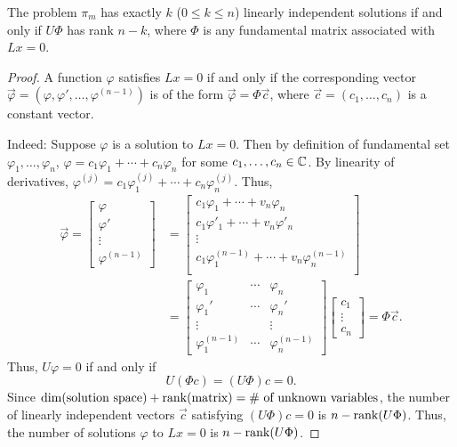 \documentclass[10.5pt, oneside, a4paper]{article}
\begin{document}
\begin{thm}\label{thm:exactly k l.i.d solutions iff rank n-k}
    The problem $\pi_m$ has exactly $k$ ($0\leq k\leq n$) linearly independent solutions if and only if $U\Phi$ has rank $n-k$, where $\Phi$ is any fundamental matrix associated with $Lx=0$.
\end{thm}
\begin{proof}
    A function $\varphi$ satisfies $Lx=0$ if and only if the corresponding vector $\vec{\varphi}=(\varphi, \varphi', \ldots, \varphi^{(n-1)})$ is of the form $\vec{\varphi}=\Phi \vec{c}$, where $\vec{c}=(c_1,\ldots, c_n)$ is a constant vector.

    {\color{blue}
    Indeed: Suppose $\varphi$ is a solution to $Lx=0$. Then by definition of fundamental set $\varphi_1,\ldots,\varphi_n$, $\varphi = c_1\varphi_1+\cdots+c_n\varphi_n$ for some $c_1,\ldots,c_n\in\mathbb C$. By linearity of derivatives, $\varphi^{(j)} = c_1\varphi_1^{(j)} + \cdots + c_n\varphi_n^{(j)}$. Thus,
    \begin{align*}
        \vec{\varphi} =
        \begin{bmatrix}
            \varphi\\
            \varphi'\\
            \vdots\\
            \varphi^{(n-1)}
        \end{bmatrix} &= 
        \begin{bmatrix}
            c_1\varphi_1 + \cdots + v_n\varphi_n\\
            c_1\varphi'_1 + \cdots + v_n\varphi'_n\\
            \vdots\\
            c_1\varphi^{(n-1)}_1 + \cdots + v_n\varphi^{(n-1)}_n\\
        \end{bmatrix}\\
        &= \begin{bmatrix}
            \varphi_1 & \cdots & \varphi_n\\
            \varphi_1' & \cdots & \varphi_n'\\
            \vdots &  & \vdots\\
            \varphi_1^{(n-1)} & \cdots & \varphi_n^{(n-1)}
        \end{bmatrix}
        \begin{bmatrix}
            c_1\\
            \vdots\\
            c_n
        \end{bmatrix} = \Phi \vec{c}.
    \end{align*}
    }
    Thus, $U\varphi=0$ if and only if
    \[U(\Phi c) = (U\Phi)c = 0.\]
    Since $\dim(\text{solution space}) + \operatorname{rank}(\text{matrix}) = \text{$\#$ of unknown variables}$, the number of linearly independent vectors $\vec{c}$ satisfying $(U\Phi)c=0$ is $n-\operatorname{rank}(U\Phi)$. {\color{blue}Thus, the number of solutions $\varphi$ to $Lx=0$ is $n-\operatorname{rank}(U\Phi)$.}
    

\end{proof}
\end{document}
